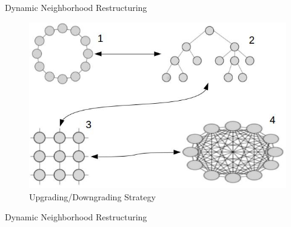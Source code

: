 \documentclass[table]{beamer}
\begin{document}
	\begin{frame}{Dynamic Neighborhood Restructuring}
		\begin{figure}[v]
			\includegraphics[scale=0.6]{restructuring}
			\centering
			\caption{Upgrading/Downgrading Strategy}
			\label{ref:restructuring}
		\end{figure}		
	\end{frame}
	
	\begin{frame}{Dynamic Neighborhood Restructuring}
		\begin{block}{}
		\end{block}
	\end{frame}
	
\end{document}

